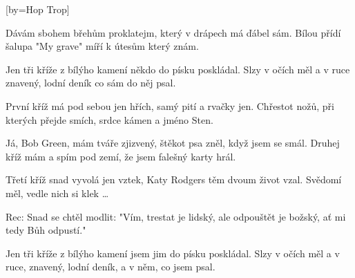 [by={Hop Trop}]

\beginverse{}
Dávám sbohem břehům proklatejm,
který v drápech má ďábel sám.
Bílou přídí šalupa "My grave"
míří k útesům který znám.
\endverse{}

\beginchorus{}
Jen tři kříže z bílýho kamení někdo do písku poskládal.
Slzy v očích měl a v ruce znavený,
lodní deník co sám do něj psal.
\endchorus{}

\beginverse{}
První kříž má pod sebou jen hřích,
samý pití a rvačky jen.
Chřestot nožů, při kterých přejde smích,
srdce kámen a jméno Sten.
\endverse{}

\beginchorus{}

\endchorus{}

\beginverse{}
Já, Bob Green, mám tváře zjizvený,
štěkot psa zněl, když jsem se smál.
Druhej kříž mám a spím pod zemí,
že jsem falešný karty hrál.
\endverse{}

\beginchorus{}

\endchorus{}

\beginverse{}
Třetí kříž snad vyvolá jen vztek,
Katy Rodgers těm dvoum život vzal.
Svědomí měl, vedle nich si klek \ldots{}
\endverse{}

\beginverse{}
Rec: Snad se chtěl modlit: "Vím, trestat je lidský,
ale odpouštět je božský, ať mi tedy Bůh odpustí."
\endverse{}

\beginchorus{}
Jen tři kříže z bílýho kamení jsem jim do písku poskládal.
Slzy v očích měl a v ruce, znavený,
lodní deník, a v něm, co jsem psal.
\endchorus{}

\endsong{}
